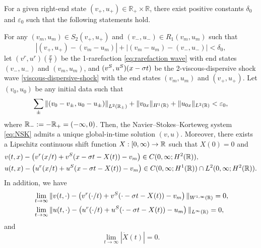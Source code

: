\documentclass[11pt,reqno]{amsart}
\begin{document}
\begin{theorem}\label{thm:main}
    For a given right-end state $(v_+,u_+)\in \mathbb{R}_+\times\mathbb{R}$, there exist positive constants $\delta_0$ and $\varepsilon_0$ such that the following statements hold.
        
   For any $(v_m,u_m) \in S_2(v_+,u_+)$ and $(v_-,u_-) \in R_1(v_m,u_m)$ such that 
   \[|(v_+,u_+)-(v_m-u_m)|+|(v_m-u_m)-(v_-,u_-)|<\delta_0,\]
   let $(v^r,u^r)(\frac{x}{t})$ be the 1-rarefaction \eqref{eq:rarefaction wave} with end states $(v_-,u_-)$ and $(v_m,u_m)$, and  $(v^S,u^S)(x-\sigma t)$ be the 2-viscous-dispersive shock wave \eqref{viscous-dispersive-shock} with the end states $(v_m,u_m)$ and $(v_+,u_+)$. Let $(v_0,u_0)$ be any initial data such that
   \[\sum_{\pm}\left\|(v_0-v_{\pm},u_0-u_{\pm})\right\|_{L^2(\mathbb{R}_\pm)}+\|v_{0x}\|_{H^1(\mathbb{R})}+\|u_{0x}\|_{L^2(\mathbb{R})}<\varepsilon_0,\]
   where $\mathbb{R}_-:=-\mathbb{R}_+=(-\infty,0)$. Then, the Navier--Stokes--Korteweg system \eqref{eq:NSK} admits a unique global-in-time solution $(v,u)$. Moreover, there exists a Lipschitz continuous shift function $X:[0,\infty)\to \mathbb R$ such that $X(0)=0$ and 
   \begin{equation*}
   \begin{aligned}
      &v(t,x)-\left(v^r(x/t) + v^S(x-\sigma t -X(t)) -v_m \right)\in C(0,\infty;H^2(\mathbb{R})),\\
      &u(t,x)-\left(u^r(x/t) + u^S(x-\sigma t -X(t)) -v_m \right)\in C(0,\infty;H^1(\mathbb{R}))\cap L^2(0,\infty;H^2(\mathbb{R})).
   \end{aligned}
   \end{equation*}
   In addition, we have
   \begin{equation*}
   \begin{aligned}
   &\lim_{t\to\infty}\|v(t,\cdot)-\left(v^r(\cdot/t)+v^S(\cdot-\sigma t-X(t))-v_m\right)\|_{W^{1,\infty}(\mathbb{R})}=0,\\
   &\lim_{t\to\infty}\|u(t,\cdot)-\left(u^r(\cdot/t)+u^S(\cdot-\sigma t-X(t))-u_m\right)\|_{L^{\infty}(\mathbb{R})}=0,
   \end{aligned}
   \end{equation*}
	and
	\begin{equation}\label{xlimit}
		\lim_{t\to\infty} |\dot{X}(t)|=0.
	\end{equation}
\end{theorem}
    
\end{document}
